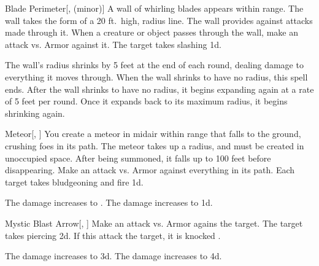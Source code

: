 \lowercase{\hypertarget{spell:Blade Perimeter}{}}\label{spell:Blade Perimeter}
\begin{freeability}[Rank 4]{\hypertarget{spell:Blade Perimeter}{Blade Perimeter}}[,  (minor)]
A wall of whirling blades appears within \rngmed range.
The wall takes the form of a 20 ft.\ high, \areamed radius line.
The wall provides  against attacks made through it.
When a creature or object passes through the wall, make an attack vs. Armor against it.
\hit The target takes slashing  \minus1d.

\rankline
{} The wall's radius shrinks by 5 feet at the end of each round, dealing damage to everything it moves through.
When the wall shrinks to have no radius, this spell ends.
 After the wall shrinks to have no radius, it begins expanding again at a rate of 5 feet per round.
Once it expands back to its maximum radius, it begins shrinking again.
\end{freeability}
\vspace{0.25em}



\lowercase{\hypertarget{spell:Meteor}{}}\label{spell:Meteor}
\begin{freeability}[Rank 4]{\hypertarget{spell:Meteor}{Meteor}}[, ]
You create a meteor in midair within \rngclose range that falls to the ground, crushing foes in its path.
The meteor takes up a \areasmall radius, and must be created in unoccupied space.
After being summoned, it falls up to 100 feet before disappearing.
Make an attack vs. Armor against everything in its path.
\hit Each target takes bludgeoning and fire  \minus1d.

\rankline
{} The damage increases to .
 The damage increases to  \plus1d.
\end{freeability}
\vspace{0.25em}



\lowercase{\hypertarget{spell:Mystic Blast Arrow}{}}\label{spell:Mystic Blast Arrow}
\begin{freeability}[Rank 4]{\hypertarget{spell:Mystic Blast Arrow}{Mystic Blast Arrow}}[, ]
Make an attack vs. Armor agains the target.
\hit The target takes piercing  \plus2d.
If this attack  the target, it is knocked .

\rankline
{} The damage increases to  \plus3d.
 The damage increases to  \plus4d.
\end{freeability}
\vspace{0.25em}



